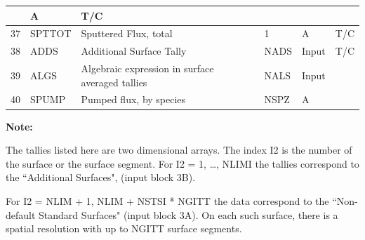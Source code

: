 \begin{landscape}
\begin{longtable}{|r|l|l|l|l|c|}
			   & \si{\ampere}   & T/C
    \\  \hline
    37                     & SPTTOT         & Sputtered Flux, total
			   & 1
			   & \si{\ampere}   & T/C
    \\  \hline
    38                     & ADDS           & Additional Surface Tally
			   & NADS
			   & Input          & T/C
    \\  \hline
    39                     & ALGS           & Algebraic expression in surface
    averaged tallies       & NALS
			   & Input          &
    \\  \hline
    40                     & SPUMP          & Pumped flux, by species
			   & NSPZ
			   & \si{\ampere}   &
    \\  \hline
  \end{longtable}

  \textbf{Note:}

  The tallies listed here are two dimensional arrays.
  The  index I2 is the number of the surface or the surface
  segment.
  For I2 = 1, \dots, NLIMI the tallies correspond to the ``Additional Surfaces",
  (input block 3B).

  For I2 = NLIM + 1, NLIM + NSTSI * NGITT the data correspond to the
  ``Non-default Standard Surfaces" (input block 3A).
  On each such surface, there is a spatial resolution with up to NGITT surface
  segments.
\end{landscape}
